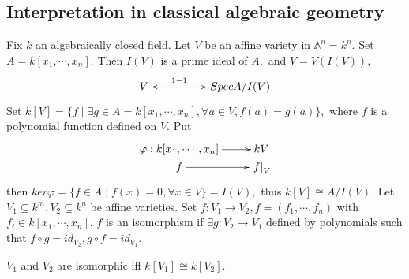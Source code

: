 \subsection*{Interpretation in classical algebraic geometry}
Fix $k$ an algebraically closed field. Let $V$ be an affine variety
in $\mathbb{A}^n=k^n.$ Set $A=k[x_1,\cdots,x_n].$ Then $I(V)$ is a
prime ideal of $A,$ and $V=V(I(V)),$
\[ \xymatrix@C=5em{ V \ar@{<->}[r]^-{1-1} & {SpecA/I(V)} }  \]
Set $k[V]=\{f\mid \exists g\in A=k[x_1,\cdots,x_n],\forall a\in
V,f(a)=g(a)\},$ where $f$ is a polynomial function defined on $V.$
Put
\[ \xymatrix@R=0em{
   {\varphi:k[x_1,\cdots,x_n]} \ar[r] & k{V}  \\
   f \ar@{|->}[r] & {\left.f\right|_V} }  \]
then $ker\varphi=\{f\in A\mid f(x)=0,\forall x\in V\}=I(V),$ thus
$k[V]\cong A/I(V).$ Let $V_1\subseteq k^m,V_2\subseteq k^n$ be
affine varieties. Set $f:V_1\rightarrow V_2, f=(f_1,\cdots,f_n)$
with $f_i\in k[x_1,\cdots,x_n].$ $f$ is an isomorphism if $\exists
g:V_2\rightarrow V_1$ defined by polynomials such that $f\circ
g=id_{V_2}, g\circ f=id_{V_1}.$
\begin{thm}
$V_1$ and $V_2$ are isomorphic iff $k[V_1]\cong k[V_2].$
\end{thm}
